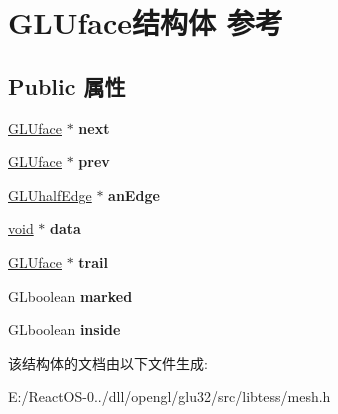 \hypertarget{struct_g_l_uface}{}\section{G\+L\+Uface结构体 参考}
\label{struct_g_l_uface}
\subsection*{Public 属性}
\begin{DoxyCompactItemize}
\item 
\mbox{\label{struct_g_l_uface_afe7bc8a800b99fceea6f4efa10c0d06d}} 
\hyperlink{struct_g_l_uface}{G\+L\+Uface} $\ast$ {\bfseries next}
\item 
\mbox{\label{struct_g_l_uface_a85c4985415b0480f740d4d89d2b3dfd0}} 
\hyperlink{struct_g_l_uface}{G\+L\+Uface} $\ast$ {\bfseries prev}
\item 
\mbox{\label{struct_g_l_uface_a22373b729c5939af66a0906168b725f9}} 
\hyperlink{struct_g_l_uhalf_edge}{G\+L\+Uhalf\+Edge} $\ast$ {\bfseries an\+Edge}
\item 
\mbox{\label{struct_g_l_uface_ad6a5ae831dc15d3dcc0e3add153df516}} 
\hyperlink{interfacevoid}{void} $\ast$ {\bfseries data}
\item 
\mbox{\label{struct_g_l_uface_a1f33a48480c9cefe3b9eefdfe5e869da}} 
\hyperlink{struct_g_l_uface}{G\+L\+Uface} $\ast$ {\bfseries trail}
\item 
\mbox{\label{struct_g_l_uface_a1842d412a54f52d6d4965091697e9f55}} 
G\+Lboolean {\bfseries marked}
\item 
\mbox{\label{struct_g_l_uface_af92280bfdfb258a1cb51b392ba2335be}} 
G\+Lboolean {\bfseries inside}
\end{DoxyCompactItemize}


该结构体的文档由以下文件生成\+:\begin{DoxyCompactItemize}
\item 
E\+:/\+React\+O\+S-\/0../dll/opengl/glu32/src/libtess/mesh.\+h\end{DoxyCompactItemize}
